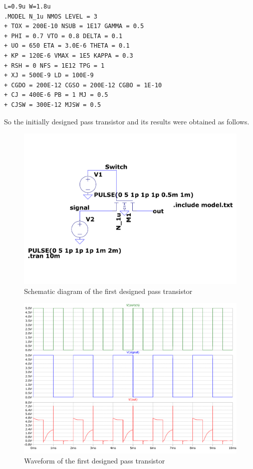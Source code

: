 \documentclass[a4paper,11pt]{article}%
\begin{document}
\begin{verbatim}
L=0.9u W=1.8u
.MODEL N_1u NMOS LEVEL = 3
+ TOX = 200E-10 NSUB = 1E17 GAMMA = 0.5
+ PHI = 0.7 VTO = 0.8 DELTA = 0.1
+ UO = 650 ETA = 3.0E-6 THETA = 0.1
+ KP = 120E-6 VMAX = 1E5 KAPPA = 0.3
+ RSH = 0 NFS = 1E12 TPG = 1
+ XJ = 500E-9 LD = 100E-9
+ CGDO = 200E-12 CGSO = 200E-12 CGBO = 1E-10
+ CJ = 400E-6 PB = 1 MJ = 0.5
+ CJSW = 300E-12 MJSW = 0.5
\end{verbatim}

So the initially designed pass transistor and its results were obtained as follows.
\begin{figure}[H]
	\centering
	\includegraphics[scale=0.5]{figures/2part2/without_res_cct.pdf}
	\caption{Schematic diagram of the first designed pass transistor}
\end{figure}
\begin{figure}[H]
	\centering
	\includegraphics[scale=0.5]{figures/2part2/without_res_wave.pdf}
	\caption{Waveform of the first designed pass transistor}
\end{figure}
\end{document}
